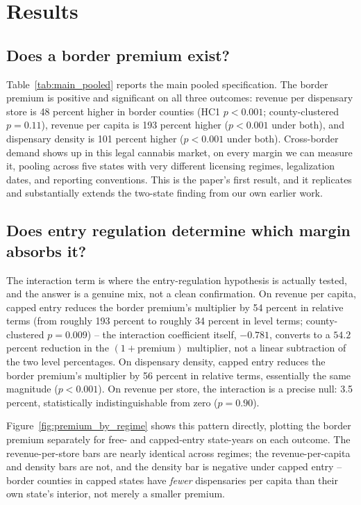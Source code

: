 \documentclass[12pt]{article}
\begin{document}
\section{Results}
\label{sec:results}

\subsection{Does a border premium exist?}



Table~\ref{tab:main_pooled} reports the main pooled specification. The border premium is positive and
significant on all three outcomes: revenue per dispensary store is 48 percent higher in border counties (HC1
$p<0.001$; county-clustered $p=0.11$), revenue per capita is 193 percent higher ($p<0.001$ under both), and
dispensary density is 101 percent higher ($p<0.001$ under both). Cross-border demand shows up in this legal
cannabis market, on every margin we can measure it, pooling across five states with very different licensing
regimes, legalization dates, and reporting conventions. This is the paper's first result, and it replicates and
substantially extends the two-state finding from our own earlier work.

\subsection{Does entry regulation determine which margin absorbs it?}

The interaction term is where the entry-regulation hypothesis is actually tested, and the answer is a genuine
mix, not a clean confirmation. On revenue per capita, capped entry reduces the border premium's multiplier by
54 percent in relative terms (from roughly 193 percent to roughly 34 percent in level terms; county-clustered
$p=0.009$) -- the interaction coefficient itself, $-0.781$, converts to a $54.2$ percent reduction in the
$(1+\text{premium})$ multiplier, not a linear subtraction of the two level percentages. On dispensary density,
capped entry reduces the border premium's multiplier by 56 percent in relative terms, essentially the same
magnitude ($p<0.001$). On revenue per store, the interaction is a precise null: 3.5 percent, statistically
indistinguishable from zero ($p=0.90$).

Figure~\ref{fig:premium_by_regime} shows this pattern directly, plotting the border premium separately for
free- and capped-entry state-years on each outcome. The revenue-per-store bars are nearly identical across
regimes; the revenue-per-capita and density bars are not, and the density bar is negative under capped entry --
border counties in capped states have \emph{fewer} dispensaries per capita than their own state's interior, not
merely a smaller premium.
\end{document}
